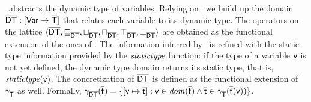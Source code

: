 \documentclass{llncs}
\begin{document}
\dynamictype\ abstracts the dynamic type of variables. 
Relying on \types\ we build up the domain $\mathsf{\overline{DT}} : [\mathsf{Var} \rightarrow\mathsf{\overline{T}}]$ that relates each variable to its dynamic type. The operators on the lattice $\langle \mathsf{\overline{DT}}, \sqsubseteq_{\mathsf{\overline{DT}}}, \sqcup_{\mathsf{\overline{DT}}}, \sqcap_{\mathsf{\overline{DT}}}, \top_{\mathsf{\overline{DT}}}, \bot_{\mathsf{\overline{DT}}} \rangle$ are obtained as the functional extension of the ones of \types. The information inferred by \dynamictype\ is refined with the static type information provided by the $\mathit{statictype}$ function: if the type of a variable $\mathsf{v}$ is not yet defined, the dynamic type domain returns its static type, that is, $\mathit{statictype}(\mathsf{v})$. The concretization of $\mathsf{\overline{DT}}$ is defined as the functional extension of $\gamma_{\mathsf{\overline{T}}}$ as well. Formally, $\gamma_{\mathsf{\overline{DT}}}(\mathsf{\overline{f}})=\{[\mathsf{v} \mapsto \mathsf{\overline{t}}] : \mathsf{v} \in \mathit{dom}(\mathsf{\overline{f}}) \land \mathsf{\overline{t}} \in \gamma_{\mathsf{\overline{T}}}(\mathsf{\overline{f}}(\mathsf{v}))\}$.
\end{document}
